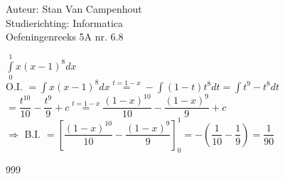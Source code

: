 \documentclass[a4paper]{article}
\begin{document}
  
\noindent \large Auteur: Stan Van Campenhout \\
\noindent \large Studierichting:  Informatica\\
\noindent \large Oefeningenreeks 5A nr. 6.8\\

\medskip

\normalsize

$ \displaystyle\int\limits_0^1x\left(x-1\right)^8dx $\\

O.I. $ =  \displaystyle\int x\left(x-1\right)^8dx \stackrel{t = 1-x}{=} -\displaystyle\int\left(1-t\right)t^8dt = \displaystyle\int t^9-t^8dt $\\

$ = \dfrac{t^{10}}{10}-\dfrac{t^9}{9} + c \stackrel{t = 1-x}{=} \dfrac{\left(1-x\right)^{10}}{10}-\dfrac{\left(1-x\right)^9}{9} + c $\\

$ \Rightarrow $ B.I. $ = \left[\dfrac{\left(1-x\right)^{10}}{10}-\dfrac{\left(1-x\right)^9}{9}\right]_0^1 = -\left(\dfrac{1}{10}-\dfrac{1}{9}\right) = \dfrac{1}{90} $\\

\begin{thebibliography}{999}
\end{thebibliography}
\end{document}
